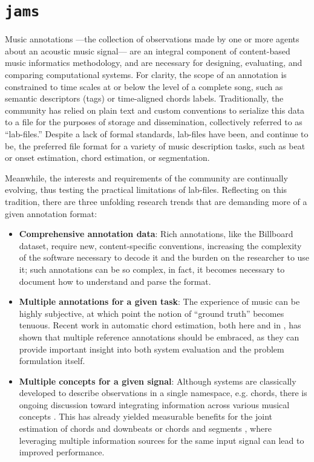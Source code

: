 \section{\texttt{jams}}
\label{sec:jams}

Music annotations ---the collection of observations made by one or more agents about an acoustic music signal--- are an integral component of content-based music informatics methodology, and are necessary for designing, evaluating, and comparing computational systems.
For clarity, the scope of an annotation is constrained to time scales at or below the level of a complete song, such as semantic descriptors (tags) or time-aligned chords labels.
Traditionally, the community has relied on plain text and custom conventions to serialize this data to a file for the purposes of storage and dissemination, collectively referred to as ``lab-files.''
Despite a lack of formal standards, lab-files have been, and continue to be, the preferred file format for a variety of music description tasks, such as beat or onset estimation, chord estimation, or segmentation.

Meanwhile, the interests and requirements of the community are continually evolving, thus testing the practical limitations of lab-files.
Reflecting on this tradition, there are three unfolding research trends that are demanding more of a given annotation format:

\begin{itemize}
\item \textbf{Comprehensive annotation data}:
Rich annotations, like the Billboard dataset\cite{Burgoyne2011Expert}, require new, content-specific conventions, increasing the complexity of the software necessary to decode it and the burden on the researcher to use it; such annotations can be so complex, in fact, it becomes necessary to document how to understand and parse the format\cite{De2012Parsing}.

\item \textbf{Multiple annotations for a given task}:
The experience of music can be highly subjective, at which point the notion of ``ground truth'' becomes tenuous.
Recent work in automatic chord estimation, both here and in \cite{Ni2013Understanding}, has shown that multiple reference annotations should be embraced, as they can provide important insight into both system evaluation and the problem formulation itself.

\item \textbf{Multiple concepts for a given signal}:
Although systems are classically developed to describe observations in a single namespace, e.g. chords, there is ongoing discussion toward integrating information across various musical concepts \cite{Vincent2010Roadmap}.
This has already yielded measurable benefits for the joint estimation of chords and downbeats \cite{Papadopoulos2011Joint} or chords and segments \cite{Mauch2009Using}, where leveraging multiple information sources for the same input signal can lead to improved performance.
\end{itemize}


